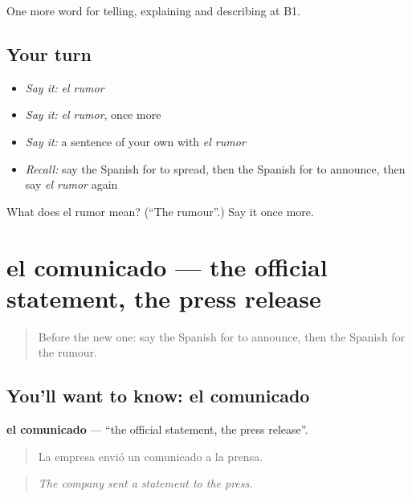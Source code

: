 \begin{grammarlens}[title={What you've built}]
One more word for telling, explaining and describing at B1.
\end{grammarlens}

\subsection*{Your turn}
\begin{itemize}
\raggedright
  \item \emph{Say it:} \emph{el rumor}
  \item \emph{Say it:} \emph{el rumor}, once more
  \item \emph{Say it:} a sentence of your own with \emph{el rumor}
  \item \emph{Recall:} say the Spanish for to spread, then the Spanish for to announce, then say \emph{el rumor} again
\end{itemize}

\begin{tcolorbox}[breakable,colback=teal!4,colframe=teal!35!black,title={Before you move on}]
What does el rumor mean? (\textquotedblleft{}The rumour\textquotedblright{}.) Say it once more.
\end{tcolorbox}
\section[el comunicado]{el comunicado — the official statement, the press release}

\label{lesson:ES-C515-comunicado}



\begin{quote}
Before the new one: say the Spanish for to announce, then the Spanish for the rumour.
\end{quote}

\subsection*{You'll want to know: el comunicado}
\textbf{el comunicado} — \textquotedblleft{}the official statement, the press release\textquotedblright{}.

\begin{quote}
La empresa envió un comunicado a la prensa.
\end{quote}

\begin{quote}
\emph{The company sent a statement to the press.}
\end{quote}

